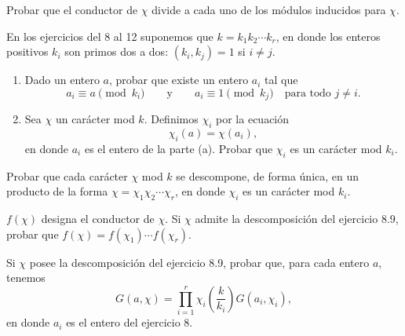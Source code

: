 \documentclass[12pt,a4paper]{book}
\begin{document}
    \begin{ejercicio}
        Probar que el conductor de $\chi$ divide a cada uno de los módulos inducidos para
        $\chi$.
    \end{ejercicio}

    En los ejercicios del 8 al 12 suponemos que $k=k_{1}k_{2}\cdots k_{r}$, en donde los enteros
    positivos $k_{i}$ son primos dos a dos: $(k_{i},k_{j})=1$ si $i\neq j$.

    \begin{ejercicio}
        \begin{enumerate}
            \item[(a)] Dado un entero $a$, probar que existe un entero $a_{i}$ tal que
            \begin{equation*}
                a_{i}\equiv a\pmod{k_{i}}\qquad\text{y}\qquad a_{i}\equiv1\pmod{k_{j}}\quad\text{para todo }j\neq i.
            \end{equation*}
            \item[(b)] Sea $\chi$ un carácter mod $k$. Definimos $\chi_{i}$ por la ecuación
            \begin{equation*}
                \chi_{i}(a)=\chi(a_{i}),
            \end{equation*}
            en donde $a_{i}$ es el entero de la parte (a). Probar que $\chi_{i}$ es un carácter
            mod $k_{i}$.
        \end{enumerate}
    \end{ejercicio}

    \begin{ejercicio}
        Probar que cada carácter $\chi$ mod $k$ se descompone, de forma única, en un
        producto de la forma $\chi=\chi_{1}\chi_{2}\cdots\chi_{r}$, en donde $\chi_{i}$ es un
        carácter mod $k_{i}$.
    \end{ejercicio}

    \begin{ejercicio}
        $f(\chi)$ designa el conductor de $\chi$. Si $\chi$ admite la descomposición del
        ejercicio 8.9, probar que $f(\chi)=f(\chi_{1})\cdots f(\chi_{r})$.
    \end{ejercicio}

    \begin{ejercicio}
        Si $\chi$ posee la descomposición del ejercicio 8.9, probar que, para cada entero
        $a$, tenemos
        \begin{equation*}
            G(a,\chi)=\prod_{i=1}^{r}\chi_{i}\left(\frac{k}{k_{i}}\right)G(a_{i},\chi_{i}),
        \end{equation*}
        en donde $a_{i}$ es el entero del ejercicio 8.
    \end{ejercicio}
\end{document}
